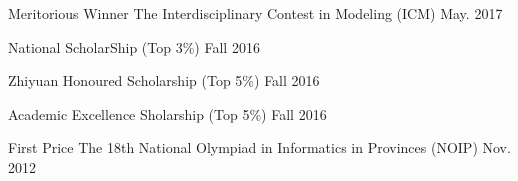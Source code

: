 
\begin{cvhonors}

  \cvhonor
    {Meritorious Winner} %
    {The Interdisciplinary Contest in Modeling (ICM)} %
    {} %
    {May. 2017} %

  \cvhonortop
    {National ScholarShip } %
    {(Top 3\%)} %
    {} %
    {Fall 2016} %

  \cvhonortop
    {Zhiyuan Honoured Scholarship} %
    {(Top 5\%)} %
    {} %
    {Fall 2016} %

  \cvhonortop
    {Academic Excellence Sholarship} %
    {(Top 5\%)} %
    {} %
    {Fall 2016} %

  \cvhonor
    {First Price} %
    {The 18th National Olympiad in Informatics in Provinces (NOIP)} %
    {} %
    {Nov. 2012} %


\end{cvhonors}
